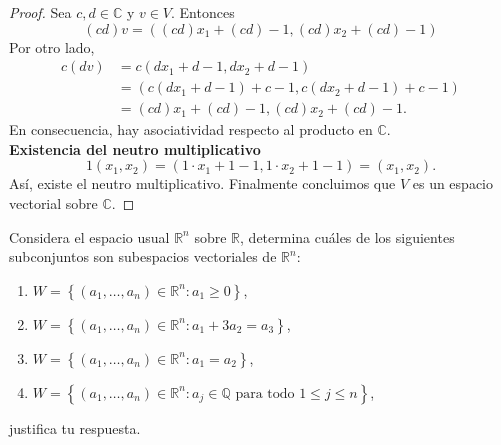 \documentclass[12pt,a4paper]{article}
\begin{document}
\begin{proof}
        Sea $c,d\in\mathbb{C}$ y $v\in V$. Entonces
        \begin{equation*}
            (cd)v=((cd)x_{1}+(cd)-1,(cd)x_{2}+(cd)-1)
        \end{equation*}
        Por otro lado,
        \begin{align*}
            c(dv)&=c(dx_{1}+d-1,dx_{2}+d-1)\\
            &=(c(dx_{1}+d-1)+c-1,c(dx_{2}+d-1)+c-1)\\
            &=(cd)x_{1}+(cd)-1,(cd)x_{2}+(cd)-1.
        \end{align*}
        En consecuencia, hay asociatividad respecto al producto en $\mathbb{C}$.\\
        \textbf{Existencia del neutro multiplicativo}\\
        \begin{equation*}
            1(x_{1},x_{2})=(1\cdot x_{1}+1-1,1\cdot x_{2}+1-1)=(x_{1},x_{2}).
        \end{equation*}
        Así, existe el neutro multiplicativo. Finalmente concluimos que $V$ es un
        espacio vectorial sobre $\mathbb{C}$.
    \end{proof}

    \begin{mdframed}[style=mdbluebox,frametitle={Ejercicio 3}]
        Considera el espacio usual $\mathbb{R}^{n}$ sobre $\mathbb{R}$, determina cuáles de los siguientes
        subconjuntos son subespacios vectoriales de $\mathbb{R}^{n}$:
        \begin{enumerate}
            \item[(a)] $W=\left\{(a_{1},\dots,a_{n})\in\mathbb{R}^{n}:a_{1}\geq0\right\}$,
            \item[(b)] $W=\left\{(a_{1},\dots,a_{n})\in\mathbb{R}^{n}:a_{1}+3a_{2}=a_{3}\right\}$,
            \item[(c)] $W=\left\{(a_{1},\dots,a_{n})\in\mathbb{R}^{n}:a_{1}=a_{2}\right\}$,
            \item[(d)] $W=\left\{(a_{1},\dots,a_{n})\in\mathbb{R}^{n}:a_{j}\in\mathbb{Q}\text{ para todo }1\leq j\leq n\right\}$,  
        \end{enumerate}
        justifica tu respuesta.
    \end{mdframed}
\end{document}
